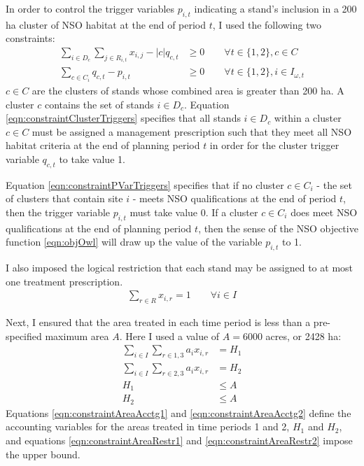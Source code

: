 In order to control the trigger variables $p_{i,t}$ indicating a stand's inclusion in a 200 ha cluster of NSO habitat at the end of period $t$, I used the following two constraints:
\begin{align}
\sum_{i \in D_c} \sum_{j \in R_{i,t}} x_{i,j} - |c| q_{c,t} &\ge 0 \qquad \forall t \in \{1,2\}, c \in C \label{eqn:constraintClusterTriggers}\\
\sum_{c \in C_i} q_{c,t} - p_{i,t} &\ge 0 \qquad \forall t \in \{1,2\}, i \in I_{\omega,t} \label{eqn:constraintPVarTriggers}
\end{align}
$c \in C$ are the clusters of stands whose combined area is greater than 200 ha. A cluster $c$ contains the set of stands $i \in D_c$. Equation \eqref{eqn:constraintClusterTriggers} specifies that all stands $i \in D_c$ within a cluster $c \in C$ must be assigned a management prescription such that they meet all NSO habitat criteria at the end of planning period $t$ in order for the cluster trigger variable $q_{c,t}$ to take value 1.

Equation \eqref{eqn:constraintPVarTriggers} specifies that if no cluster $c \in C_i$ - the set of clusters that contain site $i$ - meets NSO qualifications at the end of period $t$, then the trigger variable $p_{i,t}$ must take value 0. If a cluster $c \in C_i$ does meet NSO qualifications at the end of planning period $t$, then the sense of the NSO objective function \eqref{eqn:objOwl} will draw up the value of the variable $p_{i,t}$ to 1.

I also imposed the logical restriction that each stand may be assigned to at most one treatment prescription.
\begin{align}
\sum_{r \in R} x_{i,r} = 1  \qquad \forall i \in I \label{eqn:constraintOnePrescrip}
\end{align}

Next, I ensured that the area treated in each time period is less than a pre-specified maximum area $A$. Here I used a value of $A = 6000$ acres, or 2428 ha:
\begin{align}
\sum_{i \in I} \sum_{r \in 1,3} a_i x_{i,r} &= H_1 \label{eqn:constraintAreaAcctg1}\\
\sum_{i \in I} \sum_{r \in 2,3} a_i x_{i,r} &= H_2 \label{eqn:constraintAreaAcctg2}\\
H_1 &\le A \label{eqn:constraintAreaRestr1}\\
H_2 &\le A \label{eqn:constraintAreaRestr2}
\end{align}
Equations \ref{eqn:constraintAreaAcctg1} and \ref{eqn:constraintAreaAcctg2} define the accounting variables for the areas treated in time periods 1 and 2, $H_1$ and $H_2$, and equations \ref{eqn:constraintAreaRestr1} and \ref{eqn:constraintAreaRestr2} impose the upper bound.

